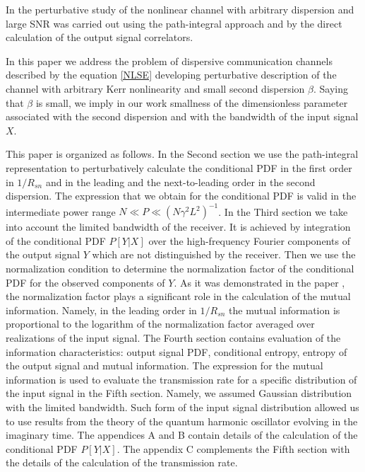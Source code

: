 \documentclass{article}
\begin{document}
In \cite{reznichenko2022optimal} the perturbative study of the nonlinear channel with arbitrary dispersion and large SNR was carried out using the path-integral approach and by the direct calculation of the output signal correlators.

In this paper we address the problem of dispersive communication channels described by the equation \eqref{NLSE} developing perturbative description of the channel with arbitrary Kerr nonlinearity and small second dispersion $\beta$. Saying that $\beta$ is small, we imply in our work smallness of the dimensionless parameter associated with the second dispersion and with the bandwidth of the input signal $X$. 


This paper is organized as follows. In the Second section we use the path-integral representation to perturbatively calculate the conditional PDF in the first order in $1/R_{sn}$ and in the leading and the next-to-leading order in the second dispersion. The expression that we obtain for the conditional PDF is valid in the intermediate power range $N \ll P \ll (N\gamma^{2}L^{2})^{-1}$. In the Third section we take into account the limited bandwidth of the receiver. It is achieved by integration of the conditional PDF $P[Y|X]$ over the high-frequency Fourier components of the output signal $Y$ which are not distinguished by the receiver. Then we use the normalization condition to determine the normalization factor of the conditional PDF for the observed components of $Y$. As it was demonstrated in the paper \cite{terekhov2016calculation}, the normalization factor plays a significant role in the calculation of the mutual information. Namely, in the leading order in $1/R_{sn}$ the mutual information is proportional to the logarithm of the normalization factor averaged over realizations of the input signal. The Fourth section contains evaluation of the information characteristics: output signal PDF, conditional entropy, entropy of the output signal and mutual information. The expression for the mutual information is used to evaluate the transmission rate for a specific distribution of the input signal in the Fifth section. Namely, we assumed Gaussian distribution with the limited bandwidth. Such form of the input signal distribution allowed us to use results from the theory of the quantum harmonic oscillator evolving in the imaginary time. The appendices A and B contain details of the calculation of the conditional PDF $P[Y|X]$. The appendix C complements the Fifth section with the details of the calculation of the transmission rate. 
\end{document}
